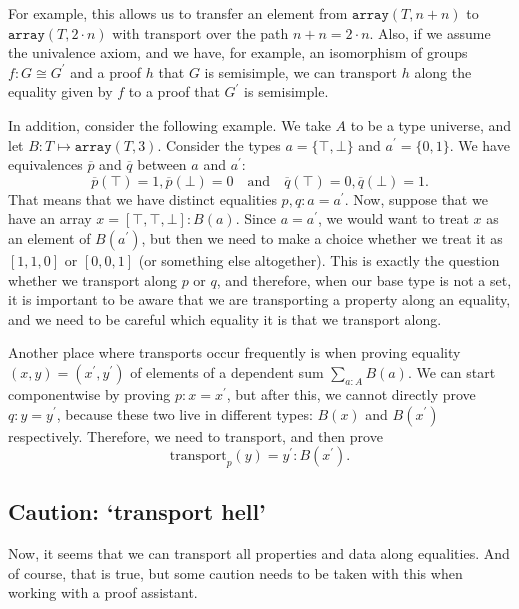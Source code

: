 For example, this allows us to transfer an element from $ \mathtt{array}(T, n + n) $ to $ \mathtt{array}(T, 2 \cdot n) $ with transport over the path $ n + n = 2 \cdot n $. Also, if we assume the univalence axiom, and we have, for example, an isomorphism of groups $ f: G \cong G^\prime $ and a proof $ h $ that $ G $ is semisimple, we can transport $ h $ along the equality given by $ f $ to a proof that $ G^\prime $ is semisimple.

\begin{example}\label{ex:transport-array}
  In addition, consider the following example. We take $ A $ to be a type universe, and let $ B: T \mapsto \mathtt{array}(T, 3) $. Consider the types $ a = \{ \top, \bot \} $ and $ a^\prime = \{ 0, 1 \} $. We have equivalences $ \overline p $ and $ \overline q $ between $ a $ and $ a^\prime $:
  \[ \overline p(\top) = 1, \overline p(\bot) = 0 \quad \text{and} \quad \overline q(\top) = 0, \overline q(\bot) = 1. \]
  That means that we have distinct equalities $ p, q: a = a^\prime $. Now, suppose that we have an array $ x = [\top, \top, \bot]: B(a) $. Since $ a = a^\prime $, we would want to treat $ x $ as an element of $ B(a^\prime) $, but then we need to make a choice whether we treat it as $ [1, 1, 0] $ or $ [0, 0, 1] $ (or something else altogether). This is exactly the question whether we transport along $ p $ or $ q $, and therefore, when our base type is not a set, it is important to be aware that we are transporting a property along an equality, and we need to be careful which equality it is that we transport along.
\end{example}

Another place where transports occur frequently is when proving equality $ (x, y) = (x^\prime, y^\prime) $ of elements of a dependent sum $ \sum_{a: A} B(a) $. We can start componentwise by proving $ p: x = x^\prime $, but after this, we cannot directly prove $ q: y = y^\prime $, because these two live in different types: $ B(x) $ and $ B(x^\prime) $ respectively. Therefore, we need to transport, and then prove
\[ \mathrm{transport}_p(y) = y^\prime: B(x^\prime). \]

\subsection{Caution: `transport hell'}
Now, it seems that we can transport all properties and data along equalities. And of course, that is true, but some caution needs to be taken with this when working with a proof assistant.


